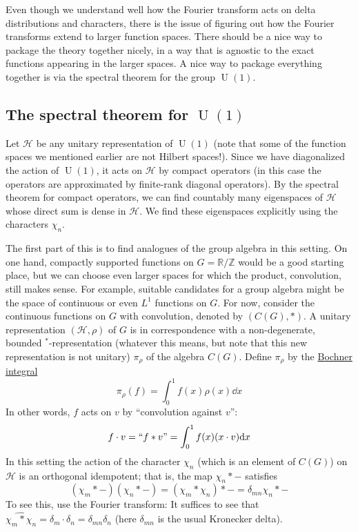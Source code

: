 \documentclass[11pt,leqno]{article}
\theoremstyle{plain}
\theoremstyle{definition}
\numberwithin{equation}{section}
\numberwithin{lem}{section}
\DeclareMathOperator{\U}{U}
\begin{document}
Even though we understand well how the Fourier transform acts on delta distributions and characters, there is the issue of figuring out how the Fourier transforms extend to larger function spaces. There should be a nice way to package the theory together nicely, in a way that is agnostic to the exact functions appearing in the larger spaces. A nice way to package everything together is via the spectral theorem for the group $\U(1)$.

\subsection{The spectral theorem for $\U(1)$}
Let $\mathcal H$ be any unitary representation of $\U(1)$ (note that some of the function spaces we mentioned earlier are not Hilbert spaces!). Since we have diagonalized the action of $\U(1)$, it acts on $\mathcal H$ by compact operators (in this case the operators are approximated by finite-rank diagonal operators). By the spectral theorem for compact operators, we can find countably many eigenspaces of $\mathcal H$ whose direct sum is dense in $\mathcal H$. We find these eigenspaces explicitly using the characters $\chi_n$.

The first part of this is to find analogues of the group algebra in this setting. On one hand, compactly supported functions on $G = \mathbb R/\mathbb Z$ would be a good starting place, but we can choose even larger spaces for which the product, convolution, still makes sense. For example, suitable candidates for a group algebra might be the space of continuous or even $L^1$ functions on $G$. For now, consider the continuous functions on $G$ with convolution, denoted by $(C(G),\ast)$. A unitary representation $(\mathcal H,\rho)$ of $G$ is in correspondence with a non-degenerate, bounded ${}^\ast$-representation (whatever this means, but note that this new representation is not unitary) $\pi_\rho$ of the algebra $C(G)$. Define $\pi_\rho$ by the \href{https://en.wikipedia.org/wiki/Bochner_integral}{Bochner integral}
\[\pi_\rho(f) = \int_0^1 f(x)\rho(x)\dd x\]
In other words, $f$ acts on $v$ by ``convolution against $v$'':
\[f\cdot v = ``f\ast v\textrm{''} = \int_0^1 f(x)(x\cdot v)\dd x\]
In this setting the action of the character $\chi_n$ (which is an element of $C(G)$) on $\mathcal H$ is an orthogonal idempotent; that is, the map $\chi_n\ast -$ satisfies 
\[(\chi_m\ast -)(\chi_n\ast -) = (\chi_m\ast\chi_n)\ast - = \delta_{mn}\chi_n\ast -\]
To see this, use the Fourier transform: It suffices to see that $\widehat{\chi_m\ast\chi_n} = \delta_m\cdot \delta_n = \delta_{mn}\delta_n$ (here $\delta_{mn}$ is the usual Kronecker delta).
\end{document}
